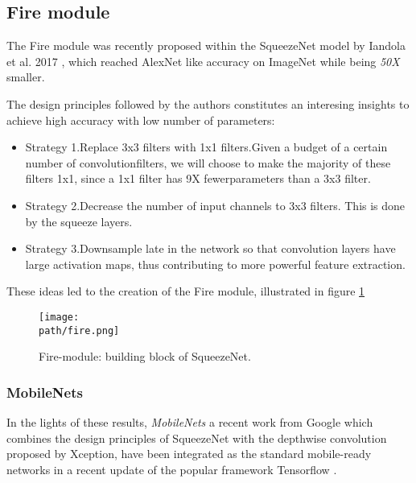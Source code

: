 \subsection{Fire module}
The Fire module was recently proposed within the SqueezeNet model by Iandola et al. 2017 \parencite{squeezenet}, which reached AlexNet like\parencite{AlexNet} accuracy on ImageNet while being \emph{50X} smaller. 

The design principles followed by the authors constitutes an interesing insights to achieve high accuracy with low number of parameters:
\begin{itemize}
	\item Strategy 1.Replace 3x3 filters with 1x1 filters.Given a budget of a certain number of convolutionfilters,  we will choose to make the majority of these filters 1x1,  since a 1x1 filter has 9X fewerparameters than a 3x3 filter.
	
	\item Strategy 2.Decrease the number of input channels to 3x3 filters. This is done by the squeeze layers.
	
	\item Strategy 3.Downsample late in the network so that convolution layers have large activation maps, thus contributing to more powerful feature extraction. 


\end{itemize}


These ideas led to the creation of the Fire module, illustrated in figure \ref{fig:fire}

\begin{figure}[h!]
 \centering
 \texttt{[image: \\path/fire.png]} 
 \caption{Fire-module: building block of SqueezeNet.}
 \label{fig:fire}
\end{figure}


\subsubsection{MobileNets}
 In the lights of these results, \emph{MobileNets} a recent work from Google \parencite{mobilenets} which combines the design principles of SqueezeNet with the depthwise convolution proposed by Xception, have been integrated as the standard mobile-ready networks in a recent update of the popular framework Tensorflow \parencite{tensorflow}.



